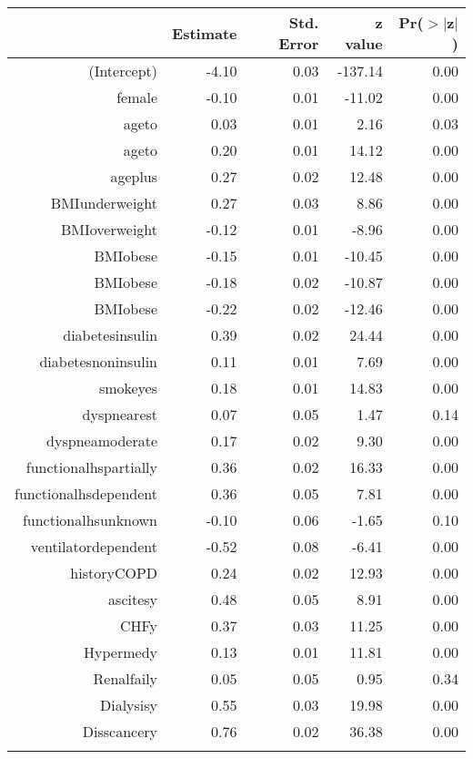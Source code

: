 \bigskip\bigskip
\centering
\begin{tabular}{rrrrr}
  \hline
 & Estimate & Std. Error & z value & Pr($>$$|$z$|$) \\ 
  \hline
(Intercept) & -4.10 & 0.03 & -137.14 & 0.00 \\ 
  female & -0.10 & 0.01 & -11.02 & 0.00 \\ 
  age\-65\-to\-74 & 0.03 & 0.01 & 2.16 & 0.03 \\ 
  age\-75\-to\-84 & 0.20 & 0.01 & 14.12 & 0.00 \\ 
  age\-85\-plus & 0.27 & 0.02 & 12.48 & 0.00 \\ 
  BMI\-underweight & 0.27 & 0.03 & 8.86 & 0.00 \\ 
  BMI\-overweight & -0.12 & 0.01 & -8.96 & 0.00 \\ 
  BMI\-obese\-1 & -0.15 & 0.01 & -10.45 & 0.00 \\ 
  BMI\-obese\-2 & -0.18 & 0.02 & -10.87 & 0.00 \\ 
  BMI\-obese\-3 & -0.22 & 0.02 & -12.46 & 0.00 \\ 
  diabetes\-insulin & 0.39 & 0.02 & 24.44 & 0.00 \\ 
  diabetes\-noninsulin & 0.11 & 0.01 & 7.69 & 0.00 \\ 
  smoke\-yes & 0.18 & 0.01 & 14.83 & 0.00 \\ 
  dyspnea\-rest & 0.07 & 0.05 & 1.47 & 0.14 \\ 
  dyspnea\-moderate & 0.17 & 0.02 & 9.30 & 0.00 \\ 
  functional\-hs\-partially & 0.36 & 0.02 & 16.33 & 0.00 \\ 
  functional\-hs\-dependent & 0.36 & 0.05 & 7.81 & 0.00 \\ 
  functional\-hs\-unknown & -0.10 & 0.06 & -1.65 & 0.10 \\ 
  ventilator\-dependent & -0.52 & 0.08 & -6.41 & 0.00 \\ 
  history\-COPD & 0.24 & 0.02 & 12.93 & 0.00 \\ 
  ascites\-y & 0.48 & 0.05 & 8.91 & 0.00 \\ 
  CHF\-y & 0.37 & 0.03 & 11.25 & 0.00 \\ 
  Hyper\-med\-y & 0.13 & 0.01 & 11.81 & 0.00 \\ 
  Renal\-fail\-y & 0.05 & 0.05 & 0.95 & 0.34 \\ 
  Dialysis\-y & 0.55 & 0.03 & 19.98 & 0.00 \\ 
  Diss\-cancer\-y & 0.76 & 0.02 & 36.38 & 0.00 \\ 
$$
\end{tabular}
